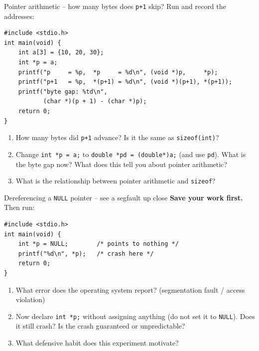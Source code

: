 \documentclass[11pt]{article}
\begin{document}
\begin{tryit}{Pointer arithmetic -- how many bytes does \texttt{p+1} skip?}
Run and record the addresses:
\begin{lstlisting}
#include <stdio.h>
int main(void) {
    int a[3] = {10, 20, 30};
    int *p = a;
    printf("p     = %p,  *p     = %d\n", (void *)p,     *p);
    printf("p+1   = %p,  *(p+1) = %d\n", (void *)(p+1), *(p+1));
    printf("byte gap: %td\n",
           (char *)(p + 1) - (char *)p);
    return 0;
}
\end{lstlisting}
\begin{enumerate}[nosep,leftmargin=*]
  \item How many bytes did \texttt{p+1} advance? Is it the same as \texttt{sizeof(int)}?
  \item Change \texttt{int *p = a;} to \texttt{double *pd = (double*)a;} (and use \texttt{pd}).
        What is the byte gap now? What does this tell you about pointer arithmetic?
  \item What is the relationship between pointer arithmetic and \texttt{sizeof}?
\end{enumerate}
\end{tryit}

\begin{tryit}{Dereferencing a \texttt{NULL} pointer -- see a segfault up close}
\textbf{Save your work first.} Then run:
\begin{lstlisting}
#include <stdio.h>
int main(void) {
    int *p = NULL;        /* points to nothing */
    printf("%d\n", *p);   /* crash here */
    return 0;
}
\end{lstlisting}
\begin{enumerate}[nosep,leftmargin=*]
  \item What error does the operating system report? (segmentation fault / access violation)
  \item Now declare \texttt{int *p;} without assigning anything (do not set it to \texttt{NULL}).
        Does it still crash? Is the crash guaranteed or unpredictable?
  \item What defensive habit does this experiment motivate?
\end{enumerate}
\end{tryit}
\end{document}
